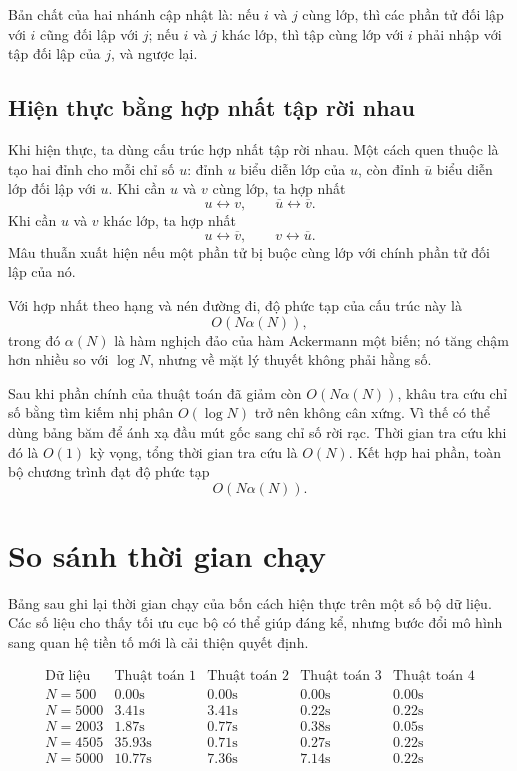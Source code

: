 \documentclass[11pt]{article}
\begin{document}
Bản chất của hai nhánh cập nhật là: nếu \(i\) và \(j\) cùng lớp, thì các phần
tử đối lập với \(i\) cũng đối lập với \(j\); nếu \(i\) và \(j\) khác lớp, thì
tập cùng lớp với \(i\) phải nhập với tập đối lập của \(j\), và ngược lại.

\subsection{Hiện thực bằng hợp nhất tập rời nhau}

Khi hiện thực, ta dùng cấu trúc hợp nhất tập rời nhau. Một cách quen thuộc là
tạo hai đỉnh cho mỗi chỉ số \(u\): đỉnh \(u\) biểu diễn lớp của \(u\), còn
đỉnh \(\overline{u}\) biểu diễn lớp đối lập với \(u\). Khi cần \(u\) và \(v\)
cùng lớp, ta hợp nhất
\[
  u\leftrightarrow v,\qquad \overline{u}\leftrightarrow \overline{v}.
\]
Khi cần \(u\) và \(v\) khác lớp, ta hợp nhất
\[
  u\leftrightarrow \overline{v},\qquad
  v\leftrightarrow \overline{u}.
\]
Mâu thuẫn xuất hiện nếu một phần tử bị buộc cùng lớp với chính phần tử đối lập
của nó.

Với hợp nhất theo hạng và nén đường đi, độ phức tạp của cấu trúc này là
\[
  O(N\alpha(N)),
\]
trong đó \(\alpha(N)\) là hàm nghịch đảo của hàm Ackermann một biến; nó tăng
chậm hơn nhiều so với \(\log N\), nhưng về mặt lý thuyết không phải hằng số.

Sau khi phần chính của thuật toán đã giảm còn \(O(N\alpha(N))\), khâu tra cứu
chỉ số bằng tìm kiếm nhị phân \(O(\log N)\) trở nên không cân xứng. Vì thế có
thể dùng bảng băm để ánh xạ đầu mút gốc sang chỉ số rời rạc. Thời gian tra cứu
khi đó là \(O(1)\) kỳ vọng, tổng thời gian tra cứu là \(O(N)\). Kết hợp hai
phần, toàn bộ chương trình đạt độ phức tạp
\[
  O(N\alpha(N)).
\]

\section{So sánh thời gian chạy}

Bảng sau ghi lại thời gian chạy của bốn cách hiện thực trên một số bộ dữ liệu.
Các số liệu cho thấy tối ưu cục bộ có thể giúp đáng kể, nhưng bước đổi mô
hình sang quan hệ tiền tố mới là cải thiện quyết định.

\[
\begin{array}{c|cccc}
\text{Dữ liệu} & \text{Thuật toán 1} & \text{Thuật toán 2}
& \text{Thuật toán 3} & \text{Thuật toán 4}\\ \hline
N=500  & 0.00\text{s} & 0.00\text{s} & 0.00\text{s} & 0.00\text{s}\\
N=5000 & 3.41\text{s} & 3.41\text{s} & 0.22\text{s} & 0.22\text{s}\\
N=2003 & 1.87\text{s} & 0.77\text{s} & 0.38\text{s} & 0.05\text{s}\\
N=4505 & 35.93\text{s} & 0.71\text{s} & 0.27\text{s} & 0.22\text{s}\\
N=5000 & 10.77\text{s} & 7.36\text{s} & 7.14\text{s} & 0.22\text{s}
\end{array}
\]
\end{document}
